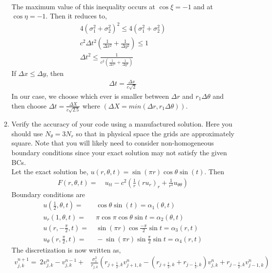 \documentclass[11pt]{article}
\newcommand{\dx}{\Delta x}
\newcommand{\dy}{\Delta y}
\newcommand{\dt}{\Delta t}
\newcommand{\vd}[2]{v^{#1}_{#2}}
\newcommand{\vnd}[1]{v^{n}_{#1}}
\newcommand{\bra}[1]{\left(#1\right)}
\newcommand{\jph}{j+\frac{1}{2}}
\newcommand{\jmh}{j-\frac{1}{2}}
\begin{document}
\begin{enumerate}
\begin{enumerate}
\begin{align*}
      \end{align*}
      The maximum value of this inequality occurs at $\cos\xi=-1$ and at $\cos\eta=-1$. Then it reduces to,
      \begin{align*}
          4\bra{\sigma_1^2+\sigma_2^2}^2\leq 4\bra{\sigma_1^2+\sigma_2^2} \\
          c^2\dt^2\bra{\frac{1}{\dx^2}+\frac{1}{\dy^2}}\leq 1\\
          \dt^2 \leq \frac{1}{c^2\bra{\frac{1}{\dx^2}+\frac{1}{\dy^2}}}
      \end{align*}
      If $\dx \leq \dy$, then
      \begin{align*}
          \dt = \frac{\dx}{c\sqrt{2}}
      \end{align*}
      In our case, we choose which ever is smaller between $\Delta r$ and $r_1\Delta\theta$ and then choose $\dt = \frac{\Delta X}{c\sqrt{2.5}}$ where $\bra{\Delta X = min\bra{\Delta r, r_1\Delta\theta}}$.
      \item {\color{blue}Verify the accuracy of your code using a manufactured solution. Here you should use $N_{\theta}=3N_r$ so that in physical space the grids are approximately square. Note that you will likely need to consider non-homogeneous boundary conditions since your exact solution may not satisfy the given BCs.}\\
      Let the exact solution be, $u(r,\theta,t) = \sin(\pi r)\cos{\theta}\sin(t)$. Then
      \begin{align*}
          F(r,\theta,t) = &\ u_{tt}-c^2\bra{\frac{1}{r}\bra{ru_r}_r + \frac{1}{r^2}u_{\theta\theta}}
      \end{align*}
      Boundary conditions are
      \begin{align*}
          u(\frac{1}{2},\theta,t) =& \ \cos{\theta}\sin{(t)} = \alpha_1(\theta,t)\\
          u_r(1,\theta,t) =&\ \pi\cos{\pi}\cos\theta\sin{t} = \alpha_2(\theta,t)\\
          u(r,-\frac{\pi}{2},t) =& \ \sin{(\pi r)}\cos{\frac{-\pi}{2}}\sin{t}=\alpha_3(r,t) \\
          u_\theta(r,\frac{\pi}{2},t) =& \ -\sin{(\pi r)}\sin{\frac{\pi}{2}}\sin t = \alpha_4(r,t)
      \end{align*}
      The discretization is now written as,
      \begin{align*}
      	\vd{n+1}{j,k} = \ 2\vd{n}{j,k}-\vd{n-1}{j,k} +&\frac{\sigma_1^2}{r_{j,k}}\bra{r_{\jph,k}\vnd{j+1,k}-\bra{r_{\jph,k}+r_{\jmh,k}}\vnd{j,k}+r_{\jmh,k}\vnd{j-1,k}}\\

\end{align*}
\end{enumerate}
\end{enumerate}
\end{document}
